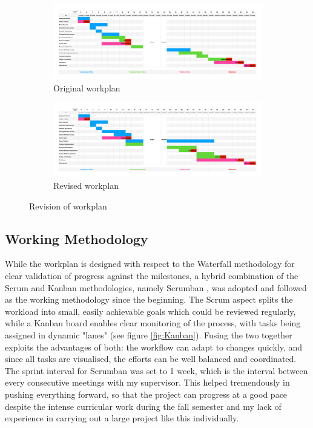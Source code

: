 \begin{figure}[ht]
\begin{subfigure}[ht]{\textwidth}
\includegraphics[width=\textwidth]{img/Gantt_old.pdf}
\caption{Original workplan}
\label{fig:Gantt_old}
\end{subfigure}
\begin{subfigure}[ht]{\textwidth}
\includegraphics[width=\textwidth]{img/Gantt_new.pdf}
\caption{Revised workplan}
\label{fig:Gantt_new}
\end{subfigure}
\caption{Revision of workplan}
\label{fig:Gantt}
\end{figure}

\subsection{Working Methodology}
While the workplan is designed with respect to the Waterfall methodology \cite{balaji2012waterfall} for clear validation of progress against the milestones, a hybrid combination of the Scrum and Kanban methodologies, namely Scrumban \cite{DBLP:conf/ispw/NikitinaKS12}, was adopted and followed as the working methodology since the beginning. The Scrum aspect splits the workload into small, easily achievable goals which could be reviewed regularly, while a Kanban board enables clear monitoring of the process, with tasks being assigned in dynamic "lanes" (see figure \ref{fig:Kanban}). Fusing the two together exploits the advantages of both: the workflow can adapt to changes quickly, and since all tasks are visualised, the efforts can be well balanced and coordinated. The sprint interval for Scrumban was set to 1 week, which is the interval between every consecutive meetings with my supervisor. This helped tremendously in pushing everything forward, so that the project can progress at a good pace despite the intense curricular work during the fall semester and my lack of experience in carrying out a large project like this individually.

